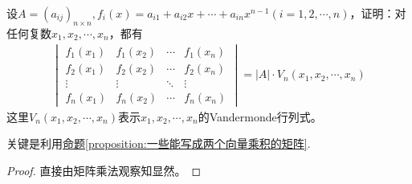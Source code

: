 \documentclass[../../main.tex]{subfiles}%
\begin{document}
\begin{proposition}\label{proposition:将矩阵拆分成Vandermode矩阵的形式}
设\(A = (a_{ij})_{n\times n},f_i(x)=a_{i1}+a_{i2}x+\cdots+a_{in}x^{n - 1}(i = 1,2,\cdots,n)\)，证明：对任何复数\(x_1,x_2,\cdots,x_n\)，都有
\begin{align*}
\begin{vmatrix}
f_1(x_1)&f_1(x_2)&\cdots&f_1(x_n)\\
f_2(x_1)&f_2(x_2)&\cdots&f_2(x_n)\\
\vdots&\vdots&\ddots&\vdots\\
f_n(x_1)&f_n(x_2)&\cdots&f_n(x_n)
\end{vmatrix}=|A|\cdot V_n(x_1,x_2,\cdots,x_n)
\end{align*}
这里\(V_n(x_1,x_2,\cdots,x_n)\)表示\(x_1,x_2,\cdots,x_n\)的Vandermonde行列式。
\end{proposition}
\begin{note}
关键是利用\hyperref[proposition:一些能写成两个向量乘积的矩阵]{命题\ref{proposition:一些能写成两个向量乘积的矩阵}}.
\end{note}
\begin{proof}

直接由矩阵乘法观察知显然。 

\end{proof}
\end{document}
